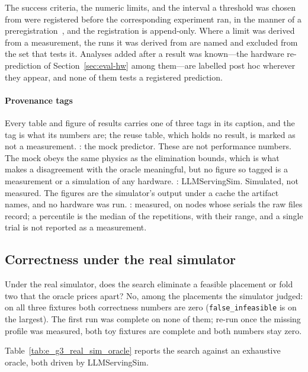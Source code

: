 The success criteria, the numeric limits, and the interval a threshold was
chosen from were registered before the corresponding experiment ran, in the
manner of a preregistration~\cite{nosek2018}, and the registration is
append-only. Where a limit was derived from a measurement, the
runs it was derived from are named and excluded from the set that tests it.
Analyses added after a result was known---the hardware re-prediction of
Section~\ref{sec:eval-hw} among them---are labelled post hoc wherever they
appear, and none of them tests a registered prediction.

\paragraph{Provenance tags} Every table and figure of results carries one of
three tags in its caption, and the tag is what its numbers are; the reuse
table, which holds no result, is marked as not a measurement. : the mock
predictor. These are not performance numbers. The mock obeys the same physics
as the elimination bounds, which is what makes a disagreement with the oracle
meaningful, but no figure so tagged is a measurement or a simulation of any
hardware. : LLMServingSim. Simulated, not measured. The
figures are the simulator's output under a cache the artifact names, and no
hardware was run. : measured, on nodes whose serials
the raw files record; a percentile is the median of the repetitions, with
their range, and a single trial is not reported as a measurement.

\subsection{Correctness under the real simulator}

Under the real simulator, does the search eliminate a feasible placement or
fold two that the oracle prices apart? No, among the placements the simulator
judged: on all three fixtures both correctness numbers are zero
(\texttt{false\_infeasible} is \egthreeFalseInfAbcde{} on the largest). The
first run was complete on none of them; re-run once the missing profile was
measured, both toy fixtures are complete and both numbers stay zero.



Table~\ref{tab:e_g3_real_sim_oracle} reports the search against an exhaustive
oracle, both driven by LLMServingSim.

